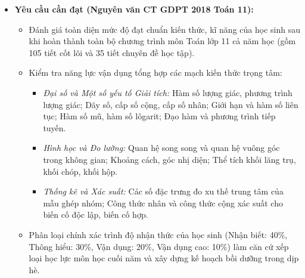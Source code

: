 \documentclass[12pt, a4paper]{article}
\begin{document}
\begin{itemize}[leftmargin=1.2cm]
    \item \textbf{Yêu cầu cần đạt (Nguyên văn CT GDPT 2018 Toán 11):}
    \begin{itemize}[leftmargin=0.6cm]
        \item Đánh giá toàn diện mức độ đạt chuẩn kiến thức, kĩ năng của học sinh sau khi hoàn thành toàn bộ chương trình môn Toán lớp 11 cả năm học (gồm 105 tiết cốt lõi và 35 tiết chuyên đề học tập).
        \item Kiểm tra năng lực vận dụng tổng hợp các mạch kiến thức trọng tâm:
        \begin{itemize}
            \item \textit{Đại số và Một số yếu tố Giải tích:} Hàm số lượng giác, phương trình lượng giác; Dãy số, cấp số cộng, cấp số nhân; Giới hạn và hàm số liên tục; Hàm số mũ, hàm số lôgarit; Đạo hàm và phương trình tiếp tuyến.
            \item \textit{Hình học và Đo lường:} Quan hệ song song và quan hệ vuông góc trong không gian; Khoảng cách, góc nhị diện; Thể tích khối lăng trụ, khối chóp, khối hộp.
            \item \textit{Thống kê và Xác suất:} Các số đặc trưng đo xu thế trung tâm của mẫu ghép nhóm; Công thức nhân và công thức cộng xác suất cho biến cố độc lập, biến cố hợp.
        \end{itemize}
        \item Phân loại chính xác trình độ nhận thức của học sinh (Nhận biết: 40\%, Thông hiểu: 30\%, Vận dụng: 20\%, Vận dụng cao: 10\%) làm căn cứ xếp loại học lực môn học cuối năm và xây dựng kế hoạch bồi dưỡng trong dịp hè.
    \end{itemize}


\end{itemize}
\end{document}
